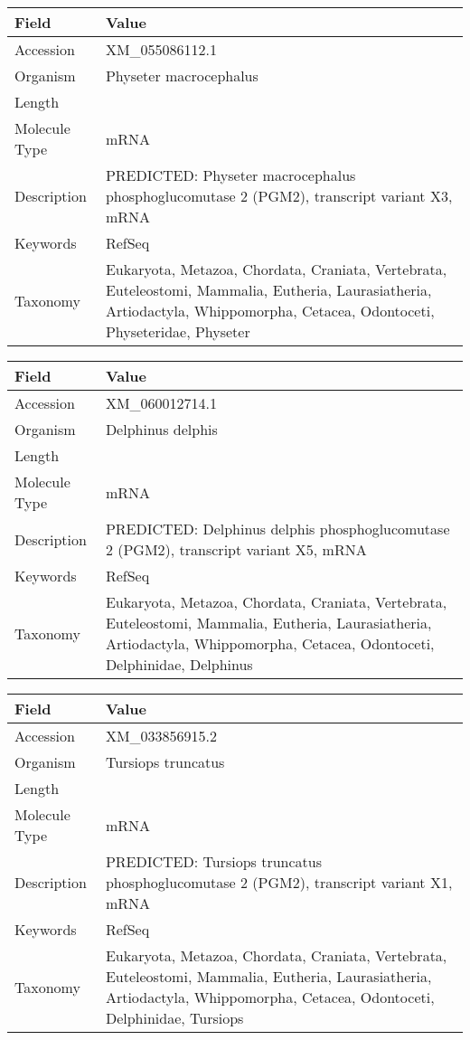 \documentclass[10pt]{article}
\begin{document}
{\footnotesize
\begin{longtable}{>{\raggedright\arraybackslash}p{4.5cm} >{\raggedright\arraybackslash}p{11.5cm}}
\textbf{Field} & \textbf{Value} \\
\hline
Accession & XM\_055086112.1 \\
Organism & Physeter macrocephalus \\
Length & 4259 \\
Molecule Type & mRNA \\
Description & PREDICTED: Physeter macrocephalus phosphoglucomutase 2 (PGM2), transcript variant X3, mRNA \\
Keywords & RefSeq \\
Taxonomy & Eukaryota, Metazoa, Chordata, Craniata, Vertebrata, Euteleostomi, Mammalia, Eutheria, Laurasiatheria, Artiodactyla, Whippomorpha, Cetacea, Odontoceti, Physeteridae, Physeter \\
\end{longtable}
}

{\footnotesize
\begin{longtable}{>{\raggedright\arraybackslash}p{4.5cm} >{\raggedright\arraybackslash}p{11.5cm}}
\textbf{Field} & \textbf{Value} \\
\hline
Accession & XM\_060012714.1 \\
Organism & Delphinus delphis \\
Length & 6672 \\
Molecule Type & mRNA \\
Description & PREDICTED: Delphinus delphis phosphoglucomutase 2 (PGM2), transcript variant X5, mRNA \\
Keywords & RefSeq \\
Taxonomy & Eukaryota, Metazoa, Chordata, Craniata, Vertebrata, Euteleostomi, Mammalia, Eutheria, Laurasiatheria, Artiodactyla, Whippomorpha, Cetacea, Odontoceti, Delphinidae, Delphinus \\
\end{longtable}
}

{\footnotesize
\begin{longtable}{>{\raggedright\arraybackslash}p{4.5cm} >{\raggedright\arraybackslash}p{11.5cm}}
\textbf{Field} & \textbf{Value} \\
\hline
Accession & XM\_033856915.2 \\
Organism & Tursiops truncatus \\
Length & 3481 \\
Molecule Type & mRNA \\
Description & PREDICTED: Tursiops truncatus phosphoglucomutase 2 (PGM2), transcript variant X1, mRNA \\
Keywords & RefSeq \\
Taxonomy & Eukaryota, Metazoa, Chordata, Craniata, Vertebrata, Euteleostomi, Mammalia, Eutheria, Laurasiatheria, Artiodactyla, Whippomorpha, Cetacea, Odontoceti, Delphinidae, Tursiops \\
\end{longtable}
}
\end{document}
